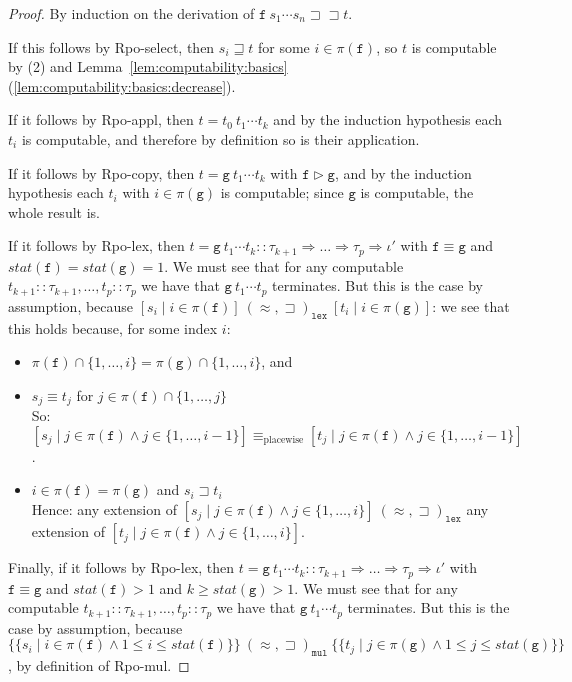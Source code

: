 \documentclass[a4paper,USenglish,cleveref,autoref,thm-restate]{lipics-v2021}
\newcommand{\arrtype}{\Rightarrow}
\newcommand{\grmain}{\sqsupset}
\newcommand{\geqmain}{\sqsupseteq}
\newcommand{\ismain}{\approx}
\newcommand{\rpomain}{\sqsupset\!\!\sqsupset}
\newcommand{\grpred}{\rhd}
\newcommand{\eqpred}{\equiv}
\newcommand{\symb}[1]{\mathtt{#1}}
\newcommand{\afun}{\symb{f}}
\newcommand{\bfun}{\symb{g}}
\newcommand{\btype}{\tau}
\newcommand{\bsort}{\iota'}
\newcommand{\status}{\mathit{stat}}
\newcommand{\filter}{\pi}
\begin{document}
\begin{proof}
By induction on the derivation of $\afun\ s_1 \cdots s_n \rpomain t$.

If this follows by Rpo-select, then $s_i \geqmain t$ for some $i \in \filter(\afun)$, so $t$ is
computable by (2) and Lemma~\ref{lem:computability:basics}(\ref{lem:computability:basics:decrease}).

If it follows by Rpo-appl, then $t = t_0\ t_1 \cdots t_k$ and by the induction hypothesis each
$t_i$ is computable, and therefore by definition so is their application.

If it follows by Rpo-copy, then $t = \bfun\ t_1 \cdots t_k$ with $\afun \grpred \bfun$, and by the
induction hypothesis each $t_i$ with $i \in \filter(\bfun)$ is computable; since $\bfun$ is
computable, the whole result is.

If it follows by Rpo-lex, then $t = \bfun\ t_1 \cdots t_k :: \btype_{k+1} \arrtype \dots
\arrtype \btype_p \arrtype \bsort$ with $\afun \eqpred \bfun$ and $\status(\afun) =
\status(\bfun) = 1$.  We must see that for any computable $t_{k+1} :: \btype_{k+1},\dots,
t_p :: \btype_p$ we have that $\bfun\ t_1 \cdots t_p$ terminates.  But this is the case by
assumption, because $[s_i \mid i \in \filter(\afun)]\ (\ismain,\grmain)_{\mathtt{lex}}\ 
[t_i \mid i \in \filter(\bfun)]$: we see that this holds because, for some index $i$:
\begin{itemize}
\item $\filter(\afun) \cap \{1,\dots,i\} = \filter(\bfun) \cap \{1,\dots,i\}$, and
\item $s_j \eqpred t_j$ for $j \in \filter(\afun) \cap \{1,\dots,j\}$ \\
  So: $[s_j \mid j \in \filter(\afun) \wedge j \in \{1,\dots,i-1\}] \eqpred_{\text{placewise}}
  [t_j \mid j \in \filter(\afun) \wedge j \in \{1,\dots,i-1\}]$.
\item $i \in \filter(\afun) = \filter(\bfun)$ and $s_i \grmain t_i$ \\
  Hence: any extension of $[s_j \mid j \in \filter(\afun) \wedge j \in \{1,\dots,i\}]\ 
  (\ismain,\grmain)_{\mathtt{lex}}$ any extension of
  $[t_j \mid j \in \filter(\afun) \wedge j \in \{1,\dots,i\}]$.
  \qedhere
\end{itemize}

Finally, if it follows by Rpo-lex, then $t = \bfun\ t_1 \cdots t_k :: \btype_{k+1} \arrtype
\dots \arrtype \btype_p \arrtype \bsort$ with $\afun \eqpred \bfun$ and $\status(\afun) > 1$
and $k \geq \status(\bfun) > 1$.  We must see that for any computable $t_{k+1} ::
\btype_{k+1},\dots,t_p :: \btype_p$ we have that $\bfun\ t_1 \cdots t_p$ terminates.  But this
is the case by assumption, because $\{\!\{s_i \mid i \in \filter(\afun) \wedge 1 \leq i \leq
\status(\afun)\}\!\}\ (\ismain,\grmain)_{\mathtt{mul}}\ \{\!\{t_j \mid j \in \filter(\bfun)
\wedge 1 \leq j \leq \status(\bfun)\}\!\}$, by definition of Rpo-mul.
\end{proof}
\end{document}
